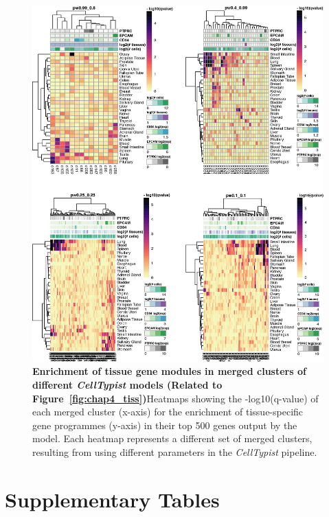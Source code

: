 \begin{figure}[ht!] 
\centering
\includegraphics[scale=0.79]{Appendix2/Figs/appB_clmGSEA.png} %
\caption[Enrichment of tissue gene modules in merged clusters of different \textit{CellTypist} models]{\textbf{Enrichment of tissue gene modules in merged clusters of different \textit{CellTypist} models (Related to Figure~\ref{fig:chap4_tiss})}\newline Heatmaps showing the -log10(q-value) of each merged cluster (x-axis) for the enrichment of tissue-specific gene programmes (y-axis) in their top 500 genes output by the model. Each heatmap represents a different set of merged clusters, resulting from using different parameters in the \textit{CellTypist} pipeline.}
\label{fig:appB_clmGSEA}
\end{figure}


\section{Supplementary Tables}
\label{sectionB1.2}

